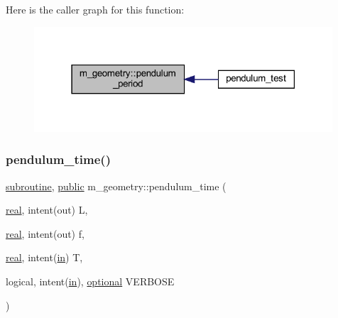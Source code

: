 Here is the caller graph for this function\+:
\nopagebreak
\begin{figure}[H]
\begin{center}
\leavevmode
\includegraphics[width=315pt]{namespacem__geometry_a9a2c835814bcdf733a2bfc1d84f4f6a7_icgraph}
\end{center}
\end{figure}
\mbox{\label{namespacem__geometry_aa15fe1bd2e07252679a3516d936b290f}} 
\subsubsection{\texorpdfstring{pendulum\+\_\+time()}{pendulum\_time()}}
{\footnotesize\ttfamily \hyperlink{M__stopwatch_83_8txt_acfbcff50169d691ff02d4a123ed70482}{subroutine}, \hyperlink{M__stopwatch_83_8txt_a2f74811300c361e53b430611a7d1769f}{public} m\+\_\+geometry\+::pendulum\+\_\+time (\begin{DoxyParamCaption}\item[{\hyperlink{read__watch_83_8txt_abdb62bde002f38ef75f810d3a905a823}{real}, intent(out)}]{L,  }\item[{\hyperlink{read__watch_83_8txt_abdb62bde002f38ef75f810d3a905a823}{real}, intent(out)}]{f,  }\item[{\hyperlink{read__watch_83_8txt_abdb62bde002f38ef75f810d3a905a823}{real}, intent(\hyperlink{M__journal_83_8txt_afce72651d1eed785a2132bee863b2f38}{in})}]{T,  }\item[{logical, intent(\hyperlink{M__journal_83_8txt_afce72651d1eed785a2132bee863b2f38}{in}), \hyperlink{option__stopwatch_83_8txt_aa4ece75e7acf58a4843f70fe18c3ade5}{optional}}]{V\+E\+R\+B\+O\+SE }\end{DoxyParamCaption})}


